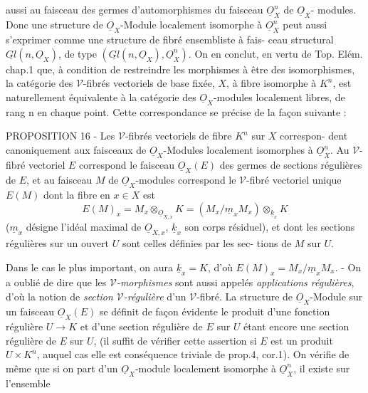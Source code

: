 
aussi au faisceau des germes d'automorphismes du faisceau $\underline{O}_X^n$ de $\underline{O}_X$-
modules. Donc une structure de $\underline{O}_X$-Module localement isomorphe à $\underline{O}_X^n$
peut aussi s'exprimer comme une structure de fibré ensembliste à fais-
ceau structural $\underline{Gl}(n,\underline{O}_X)$, de type $(\underline{Gl}(n,\underline{O}_X),\underline{O}_X^n)$. On en conclut, en
vertu de Top. Elém. chap.1 que, à condition de restreindre les morphismes
à être des isomorphismes, la catégorie des $\mathcal{V}$-fibrés vectoriels de base
fixée, $X$, à fibre isomorphe à $K^n$, est naturellement équivalente à la
catégorie des $\underline{O}_X$-modules localement libres, de rang n en chaque point.
Cette correspondance se précise de la façon suivante :

PROPOSITION 16 - Les $\mathcal{V}$-fibrés vectoriels de fibre $K^n$ sur $X$ correspon-
dent canoniquement aux faisceaux de $\underline{O}_X$-Modules localement isomorphes à
$\underline{O}_X^n$. Au $\mathcal{V}$-fibré vectoriel $E$ correspond le faisceau $\underline{O}_X(E)$ des germes
de sections régulières de $E$, et au faisceau $M$ de $\underline{O}_X$-modules correspond le
$\mathcal{V}$-fibré vectoriel unique $E(M)$ dont la fibre en $x \in X$ est
\[ E(M)_x = M_x \otimes_{\underline{O}_{X,x}} K = (M_x/\underline{m}_x M_x) \otimes_{\underline{k}_x} K \]
($\underline{m}_x$ désigne l'idéal maximal de $\underline{O}_{X,x}$, $\underline{k}_x$ son corps résiduel), et dont
les sections régulières sur un ouvert $U$ sont celles définies par les sec-
tions de $M$ sur $U$.

Dans le cas le plus important, on aura $\underline{k}_x = K$, d'où $E(M)_x = M_x/\underline{m}_x M_x$. -
On a oublié de dire que les \emph{$\mathcal{V}$-morphismes} sont aussi appelés \emph{applications
régulières}, d'où la notion de \emph{section $\mathcal{V}$-régulière} d'un $\mathcal{V}$-fibré. La
structure de $\underline{O}_X$-Module sur un faisceau $\underline{O}_X(E)$ se définit de façon évidente
le produit d'une fonction régulière $U \rightarrow K$ et d'une section régulière
de $E$ sur $U$ étant encore une section régulière de $E$ sur $U$, (il suffit de
vérifier cette assertion si $E$ est un produit $U \times K^n$, auquel cas elle est
conséquence triviale de prop.4, cor.1). On vérifie de même que si on
part d'un $\underline{O}_X$-module localement isomorphe à $\underline{O}_X^n$, il existe sur l'ensemble

\newpage

